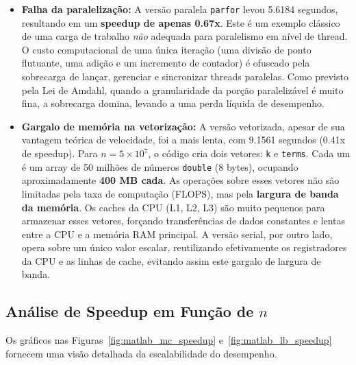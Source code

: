 \documentclass[12pt, a4paper]{article}
\begin{document}
	\begin{itemize}
		\item \textbf{Falha da paralelização:} A versão paralela \texttt{parfor}
		levou 5.6184 segundos, resultando em um \textbf{speedup de apenas 0.67x}.
		Este é um exemplo clássico de uma carga de trabalho \textit{não} adequada
		para paralelismo em nível de thread. O custo computacional de uma única
		iteração (uma divisão de ponto flutuante, uma adição e um incremento de
		contador) é ofuscado pela sobrecarga de lançar, gerenciar e sincronizar
		threads paralelas. Como previsto pela Lei de Amdahl, quando a granularidade
		da porção paralelizável é muito fina, a sobrecarga domina, levando a uma
		perda líquida de desempenho.
		
		\item \textbf{Gargalo de memória na vetorização:} A versão vetorizada,
		apesar de sua vantagem teórica de velocidade, foi a mais lenta, com 9.1561
		segundos (0.41x de speedup). Para \(n = 5\times10^7\), o código cria dois
		vetores: \texttt{k} e \texttt{terms}. Cada um é um array de 50 milhões de
		números \texttt{double} (8 bytes), ocupando aproximadamente \textbf{400 MB cada}.
		As operações sobre esses vetores não são limitadas pela taxa de computação
		(FLOPS), mas pela \textbf{largura de banda da memória}. Os caches da CPU
		(L1, L2, L3) são muito pequenos para armazenar esses vetores, forçando
		transferências de dados constantes e lentas entre a CPU e a memória RAM
		principal. A versão serial, por outro lado, opera sobre um único valor
		escalar, reutilizando efetivamente os registradores da CPU e as linhas de
		cache, evitando assim este gargalo de largura de banda.
	\end{itemize}
	
	\subsection{Análise de Speedup em Função de \(n\)}
	
	Os gráficos nas Figuras~\ref{fig:matlab_mc_speedup} e~\ref{fig:matlab_lb_speedup}
	fornecem uma visão detalhada da escalabilidade do desempenho.
	
\end{document}
